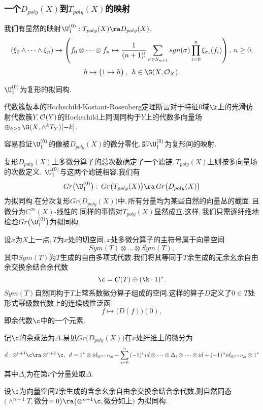 \subsubsection{一个$D_{poly}(X)$到$T_{poly}(X)$的映射}
我们有显然的映射$\U_1^{(0)}:T_{poly}(X)\ra D_{poly}(X)$,\,
$$(\xi_0\wedge\dots\wedge \xi_n)\mapsto\left(f_0\otimes\dots 
\otimes f_n\mapsto {1\over (n+1)!}
\sum_{\sigma\in S_{n+1}} sgn(\sigma) \prod_{i=0}^{n} \xi_{\sigma_i}
(f_i)\right),\,n\ge 0,$$
$$h\mapsto \bigl(1\mapsto h\bigr)\,,\,\,\,h\in\G(X,{\cal O}_X).$$

\begin{thm}
$\U_1^{(0)}$为复形的拟同构.
\end{thm}

代数簇版本的Hochschild-Kostant-Rosenberg定理断言对于特征$0$域$\k$上的光滑仿射代数簇$Y$,\,${\cal O}(Y)$的Hochschild上同调同构于$Y$上的代数多向量场\\
$\oplus_{k\ge 0}\,
   \G(X,\wedge ^k T_Y)[-k]$.

容易验证$\U_1^{(0)}$的像被$D_{poly}(X)$的微分零化,\,即$\U_1^{(0)}$为复形间的映射.

复形$D_{poly}(X)$上多微分算子的总次数确定了一个滤链.\,$T_{poly}(X)$上则按多向量场的次数定义.\,\,$\U_1^{(0)}$与这两个滤链相容.我们有
$$Gr\bigl(\U_1^{(0)}\bigr):\,Gr\bigl(T_{poly}(X)\bigr)
        \ra \,Gr\bigl(D_{poly}(X)\bigr)$$
为拟同构.在分次复形$Gr\bigl(D_{poly}(X)\bigr)$中,\,所有分量均为某些自然的向量丛的截面,\,且微分为$C^{\infty}(X)$-线性的.同样的事情对$T_{poly}(X)$显然成立.这样,\,我们只需逐纤维地检验$Gr\bigl(\U_1^{(0)}\bigr)$为拟同构.

设$x$为$X$上一点,\,$T$为$x$处的切空间.\,$x$处多微分算子的主符号属于向量空间
$$Sym(T)\otimes\dots\otimes Sym(T),$$
其中$Sym(T)$为$T$生成的自由多项式代数.我们将其等同于$T$余生成的无余幺余自由余交换余结合余代数
$$\c=C(T)\oplus (\k\cdot 1)^*. $$
$Sym(T)$自然同构于$T$上常系数微分算子组成的空间.这样的算子$D$定义了$0\in T$处形式幂级数代数上的连续线性泛函
$$f\mapsto \bigl(D(f)\bigr)(0),$$
即余代数$\c$中的一个元素.

记$\c$的余乘法为$\Delta$.易见$Gr\bigl(D_{poly}(X)\bigr)$在$x$处纤维上的微分为
$$d: \otimes ^{n+1}\c\ra \otimes^{n+2}\c,\,\,\,
                 d=1^*\otimes
                 id_{\otimes^{n+1}\c}
                 -\sum_{i=0}^n \,(-1)^i\,id\otimes\dots\otimes 
                 \Delta_i\otimes
                 \dots\otimes id+(-1)^n id_{\otimes^{n+1}\c}\otimes 1^*$$
其中$\Delta_i$为在第$i$个分量处取$\Delta$.

\begin{lem}
设$\c$为向量空间$T$余生成的含余幺余自由余交换余结合余代数,则自然同态
$\bigl(\wedge ^{n+1} T,$微分$=0\bigr)
              \ra \bigl(\otimes ^{n+1} \c,$微分如上$)$
为拟同构.
\end{lem}

